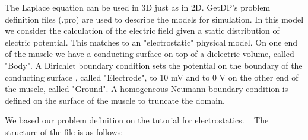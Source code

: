 \documentclass[preprint,journal]{vgtc}       %
\begin{document}
The Laplace equation can be used in 3D just as in 2D. 
GetDP's problem definition files (.pro) are used to describe the models for simulation. 
In this model we consider the calculation of the electric field given a static distribution of electric potential. 
This matches to an "electrostatic" physical model. 
On one end of the muscle we have a conducting surface on top of a dielectric volume, called "Body".
A Dirichlet boundary condition sets the potential on the boundary of the conducting surface , called "Electrode", to 10 mV and to 0 V on the other end of the muscle, called "Ground".
A homogeneous Neumann boundary condition is defined on the surface of the muscle to truncate the domain.

We based our problem definition on the tutorial for electrostatics. ~\cite{Geuzaine2009}
The structure of the file is as follows:
\end{document}
